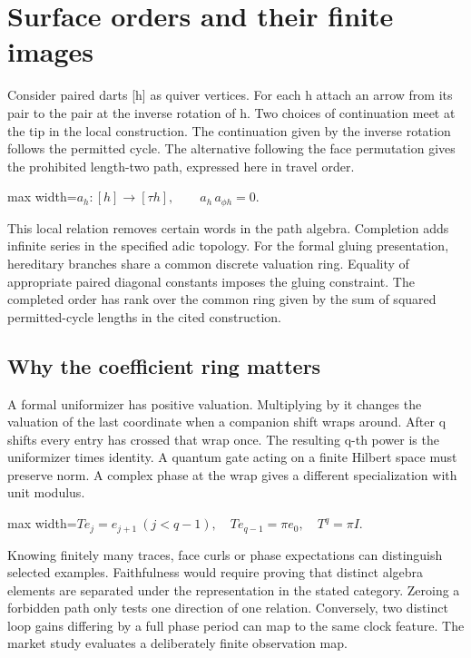 \documentclass[11pt,oneside,openany]{book}
\begin{document}
\chapter{Surface orders and their finite images}
Consider paired darts [h] as quiver vertices. For each h attach an arrow from its pair to the pair at the inverse rotation of h. Two choices of continuation meet at the tip in the local construction. The continuation given by the inverse rotation follows the permitted cycle. The alternative following the face permutation gives the prohibited length-two path, expressed here in travel order.

\begin{center}\begin{adjustbox}{max width=\linewidth}$\displaystyle a_h:[h]\longrightarrow[\tau h],\qquad a_h\,a_{\phi h}=0.$\end{adjustbox}\end{center}
This local relation removes certain words in the path algebra. Completion adds infinite series in the specified adic topology. For the formal gluing presentation, hereditary branches share a common discrete valuation ring. Equality of appropriate paired diagonal constants imposes the gluing constraint. The completed order has rank over the common ring given by the sum of squared permitted-cycle lengths in the cited construction.

\section*{Why the coefficient ring matters}
A formal uniformizer has positive valuation. Multiplying by it changes the valuation of the last coordinate when a companion shift wraps around. After q shifts every entry has crossed that wrap once. The resulting q-th power is the uniformizer times identity. A quantum gate acting on a finite Hilbert space must preserve norm. A complex phase at the wrap gives a different specialization with unit modulus.

\begin{center}\begin{adjustbox}{max width=\linewidth}$\displaystyle T e_j=e_{j+1}\ (j<q-1),\quad T e_{q-1}=\pi e_0,\quad T^q=\pi I.$\end{adjustbox}\end{center}
Knowing finitely many traces, face curls or phase expectations can distinguish selected examples. Faithfulness would require proving that distinct algebra elements are separated under the representation in the stated category. Zeroing a forbidden path only tests one direction of one relation. Conversely, two distinct loop gains differing by a full phase period can map to the same clock feature. The market study evaluates a deliberately finite observation map.
\end{document}
